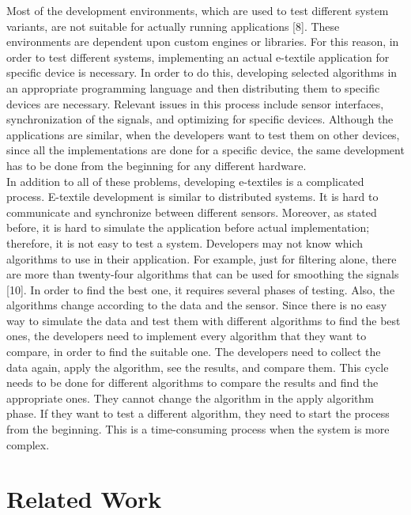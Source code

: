 	Most of the development environments, which are used to test different system variants, are not suitable for actually running applications [8]. These environments are dependent upon custom engines or libraries. For this reason, in order to test different systems, implementing an actual e-textile application for specific device is necessary. In order to do this, developing selected algorithms in an appropriate programming language and then distributing them to specific devices are necessary. Relevant issues in this process include sensor interfaces, synchronization of the signals, and optimizing for specific devices. Although the applications are similar, when the developers want to test them on other devices, since all the implementations are done for a specific device, the same development has to be done from the beginning for any different hardware.  \\
	

	In addition to all of these problems, developing e-textiles is a complicated process. E-textile development is similar to distributed systems. It is hard to communicate and synchronize between different sensors. Moreover, as stated before, it is hard to simulate the application before actual implementation; therefore, it is not easy to test a system. Developers may not know which algorithms to use in their application. For example, just for filtering alone, there are more than twenty-four algorithms that can be used for smoothing the signals [10]. In order to find the best one, it requires several phases of testing. Also, the algorithms change according to the data and the sensor. Since there is no easy way to simulate the data and test them with different algorithms to find the best ones, the developers need to implement every algorithm that they want to compare, in order to find the suitable one. The developers need to collect the data again, apply the algorithm, see the results, and compare them. This cycle needs to be done for different algorithms to compare the results and find the appropriate ones. They cannot change the algorithm in the apply algorithm phase. If they want to test a different algorithm, they need to start the process from the beginning. This is a time-consuming process when the system is more complex. 





\section{Related Work}

